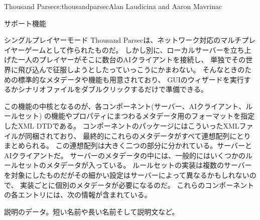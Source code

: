 \begin{aosachapter}{Thousand Parsec}{s:thousandparsec}{Alan Laudicina and Aaron Mavrinac}
\begin{aosasect1}{サポート機能}
\begin{aosasect2}{シングルプレイヤーモード}
Thousand Parsecは、ネットワーク対応のマルチプレイヤーゲームとして作られたものだ。
しかし別に、ローカルサーバーを立ち上げた一人のプレイヤーがそこに数台のAIクライアントを接続し、
単独でその世界に飛び込んで征服しようとしたっていっこうにかまわない。
そんなときのための標準的なメタデータや機能も用意されており、
GUIのウィザードを実行するかシナリオファイルをダブルクリックするだけで準備できる。

この機能の中核となるのが、各コンポーネント(サーバー、AIクライアント、ルールセット)
の機能やプロパティにまつわるメタデータ用のフォーマットを指定したXML DTDである。
コンポーネントのパッケージにはこういったXMLファイルが同梱されており、
最終的にこれらのメタデータがすべて連想配列にとりまとめられる。
この連想配列は大きく二つの部分に分かれている。サーバーとAIクライアントだ。
サーバーのメタデータの中には、一般的にはいくつかのルールセットのメタデータが入っている。
ルールセットの実装は複数のサーバーを対象にしたものだがその細かい設定はサーバーによって異なるかもしれないので、
実装ごとに個別のメタデータが必要になるのだ。
これらのコンポーネントの各エントリには、次の情報が含まれている。

\begin{aosaitemize}

  \item 説明のデータ。短い名前や長い名前そして説明文など。


\end{aosaitemize}
\end{aosasect2}
\end{aosasect1}
\end{aosachapter}
